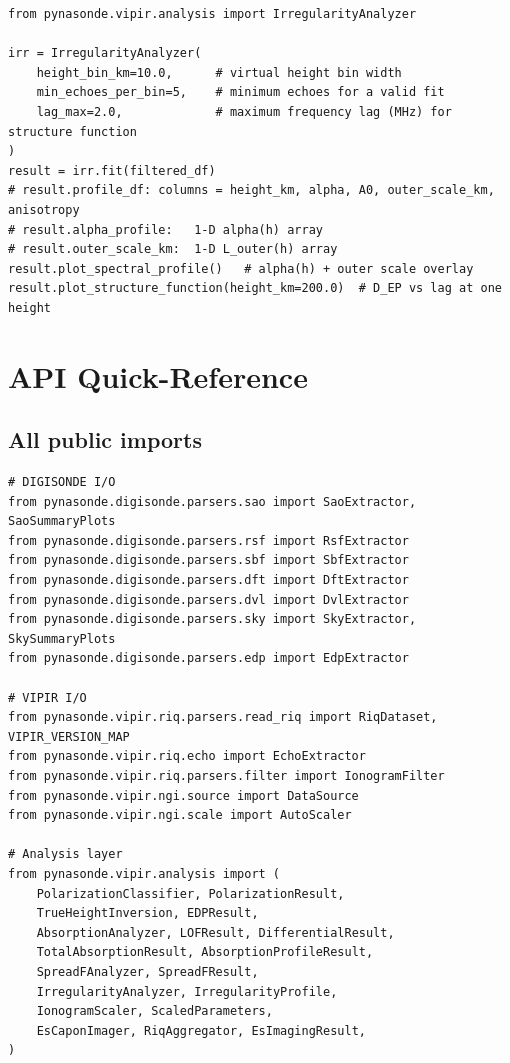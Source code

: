 \documentclass[a4paper,11pt]{article}
\begin{document}
\begin{lstlisting}[caption={IrregularityAnalyzer API}]
from pynasonde.vipir.analysis import IrregularityAnalyzer

irr = IrregularityAnalyzer(
    height_bin_km=10.0,      # virtual height bin width
    min_echoes_per_bin=5,    # minimum echoes for a valid fit
    lag_max=2.0,             # maximum frequency lag (MHz) for structure function
)
result = irr.fit(filtered_df)
# result.profile_df: columns = height_km, alpha, A0, outer_scale_km, anisotropy
# result.alpha_profile:   1-D alpha(h) array
# result.outer_scale_km:  1-D L_outer(h) array
result.plot_spectral_profile()   # alpha(h) + outer scale overlay
result.plot_structure_function(height_km=200.0)  # D_EP vs lag at one height
\end{lstlisting}

\section{API Quick-Reference}
\label{sec:api}

\subsection{All public imports}

\begin{lstlisting}
# DIGISONDE I/O
from pynasonde.digisonde.parsers.sao import SaoExtractor, SaoSummaryPlots
from pynasonde.digisonde.parsers.rsf import RsfExtractor
from pynasonde.digisonde.parsers.sbf import SbfExtractor
from pynasonde.digisonde.parsers.dft import DftExtractor
from pynasonde.digisonde.parsers.dvl import DvlExtractor
from pynasonde.digisonde.parsers.sky import SkyExtractor, SkySummaryPlots
from pynasonde.digisonde.parsers.edp import EdpExtractor

# VIPIR I/O
from pynasonde.vipir.riq.parsers.read_riq import RiqDataset, VIPIR_VERSION_MAP
from pynasonde.vipir.riq.echo import EchoExtractor
from pynasonde.vipir.riq.parsers.filter import IonogramFilter
from pynasonde.vipir.ngi.source import DataSource
from pynasonde.vipir.ngi.scale import AutoScaler

# Analysis layer
from pynasonde.vipir.analysis import (
    PolarizationClassifier, PolarizationResult,
    TrueHeightInversion, EDPResult,
    AbsorptionAnalyzer, LOFResult, DifferentialResult,
    TotalAbsorptionResult, AbsorptionProfileResult,
    SpreadFAnalyzer, SpreadFResult,
    IrregularityAnalyzer, IrregularityProfile,
    IonogramScaler, ScaledParameters,
    EsCaponImager, RiqAggregator, EsImagingResult,
)
\end{lstlisting}
\end{document}
